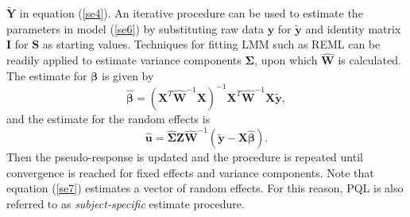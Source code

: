 $\tilde{\bm Y }$ in equation (\ref{se4}). An iterative procedure can be used to estimate the
parameters in model (\ref{se6}) by substituting raw data $\bm y$ for $\tilde{\bm y}$  and identity
matrix $\bm I$ for $\bm S$ as starting values. Techniques for fitting LMM such as REML can be
readily applied to estimate variance components $\bm \Sigma$, upon which $\hat{\bm W}$ is
calculated. The estimate for $\bm \beta$ is given by
\begin{equation}
	\hat{\bm\beta} = (\bm X^T\hat{\bm W}^{-1} \bm X)^{-1}\bm X^T\hat{\bm W}^{-1}\bm X \tilde{\bm y},
\end{equation}
and the estimate for the random effects is 
\begin{equation}\label{se7}
	\hat{\bm u} = \hat{\bm\Sigma } \bm Z \hat{\bm W}^{-1} (\tilde{\bm y}-\bm {X} \hat{\bm \beta}).
\end{equation}
Then the pseudo-response is updated and the procedure is repeated until convergence is reached for
fixed effects and variance components.  Note that equation (\ref{se7}) estimates a vector of random
effects. For this reason, PQL is also referred to as \textit{subject-specific} estimate procedure. 

